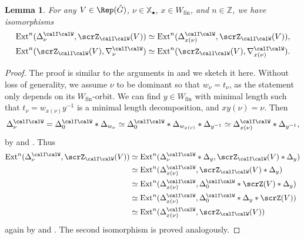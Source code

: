 \documentclass[10pt, reqno]{amsart}
\theoremstyle{plain}
\newtheorem{lemma}[theorem]{Lemma}
\theoremstyle{definition}
\numberwithin{equation}{section}
\begin{document}
\begin{lemma}\label{lemma_multiplicity_ZIW}
	For any $V\in\Rep(\hat{G})$, $\nu\in\mathbb{X}_\bullet$, $x\in W_\mathrm{fin}$, and $n\in\mathbb{Z}$, we have isomorphisms
	\begin{align*}
		\mathrm{Ext}^n(\Delta_\nu^{\calI\calW},\scrZ_{\calI\calW}(V))\simeq  	\mathrm{Ext}^n(\Delta_{x(\nu)}^{\calI\calW},\scrZ_{\calI\calW}(V)),\\
		\mathrm{Ext}^n(\scrZ_{\calI\calW}(V),\nabla_\nu^{\calI\calW})\simeq  	\mathrm{Ext}^n(\scrZ_{\calI\calW}(V),\nabla_{x(\nu)}^{\calI\calW}).
	\end{align*}
\end{lemma}
\begin{proof}
	The proof is similar to the arguments in \cite[Lemma 6.5.11]{AR} and we sketch it here. Without loss of generality, we assume $\nu$ to be dominant so that $w_\nu=t_\nu$, as the statement only depends on its $W_{\mathrm{fin}}$-orbit. We can find $y\in W_\mathrm{fin}$ with minimal length such that $t_\nu=w_{x(\nu)}y^{-1}$ is a minimal length decomposition,  and $xy(\nu)=\nu$. Then
	$$
	\Delta_{\nu}^{\calI\calW}=\Delta_0^{\calI\calW}*\Delta_{w_\nu}\simeq \Delta_0^{\calI\calW}*\Delta_{w_{x(\nu)}}*\Delta_{y^{-1}}\simeq \Delta_{x(\nu)}^{\calI\calW}*\Delta_{y^{-1}},
	$$
	by  and . Thus
	\begin{align*}
		\mathrm{Ext}^n(\Delta_\nu^{\calI\calW},\scrZ_{\calI\calW}(V)) & \simeq 	\mathrm{Ext}^n(\Delta_{\nu}^{\calI\calW}*\Delta_{y},\scrZ_{\calI\calW}(V)*\Delta_{y})\\
		&\simeq 	\mathrm{Ext}^n(\Delta_{x(\nu)}^{\calI\calW},\scrZ_{\calI\calW}(V)*\Delta_y) \\
		& \simeq 	\mathrm{Ext}^n(\Delta_{x(\nu)}^{\calI\calW}, \Delta_0^{\calI\calW}*\scrZ(V)*\Delta_y)\\
		&\simeq 	\mathrm{Ext}^n(\Delta_{x(\nu)}^{\calI\calW}, \Delta_0^{\calI\calW}*\Delta_y*\scrZ(V))\\
		&\simeq	\mathrm{Ext}^n(\Delta_{x(\nu)}^{\calI\calW},\scrZ_{\calI\calW}(V))
	\end{align*}
	again by  and . The second isomorphism is proved analogously.
\end{proof}
\end{document}
